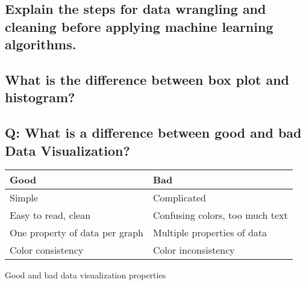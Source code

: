 \subsection{Explain the steps for data wrangling and cleaning before applying machine learning algorithms.}
\subsection{What is the difference between box plot and histogram?}
\subsection{Q: What is a difference between good and bad Data Visualization?}
\bigskip
\begin{center}
\begin{tabular}{ | p{4cm} | p{4cm}| } 
\hline
\textbf{Good} & \textbf{Bad} \\ 
\hline
Simple & Complicated \\ 
\hline
Easy to read, clean & Confusing colors, too much text \\ 
\hline
One property of data per graph & Multiple properties of data \\
\hline
Color consistency & Color inconsistency \\
\hline
\end{tabular}\par
\bigskip
Good and bad data visualization  properties
\end{center}